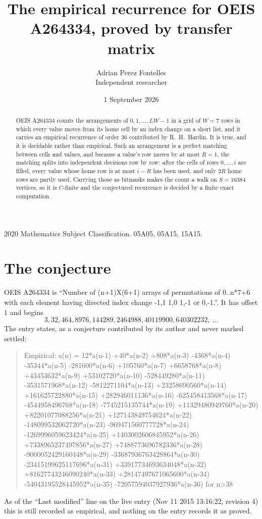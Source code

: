 \documentclass[11pt,a4paper]{article}
\title{The empirical recurrence for OEIS A264334, proved by transfer matrix}
\author{Adrian Perez Fontelles\\ \small Independent researcher}
\date{1 September 2026}
\theoremstyle{plain}
\theoremstyle{definition}
\begin{document}
\maketitle

\begin{abstract}
OEIS A264334 counts the arrangements of $0,1,\dots,LW-1$ in a grid of $W=7$ rows in which
every value moves from its home cell by an index change on a short list, and it carries an
empirical recurrence of order $36$ contributed by R.~H.~Hardin. It is true, and it is
decidable rather than empirical. Such an arrangement is a perfect matching between cells and
values, and because a value's row moves by at most $R=1$, the matching splits into
independent decisions row by row: after the cells of rows $0,\dots,i$ are filled,
every value whose home row is at most $i-R$ has been used, and only $2R$ home rows are
partly used. Carrying those as bitmasks makes the count a walk on $S=16384$ vertices, so it is
$C$-finite and the conjectured recurrence is decided by a finite exact computation.
\end{abstract}

\noindent\small 2020 Mathematics Subject Classification. 05A05, 05A15, 15A15.\normalsize

\section{The conjecture}

OEIS A264334 is ``Number of (n+1)X(6+1) arrays of permutations of 0..n*7+6 with each element having directed index change -1,1 1,0 1,-1 or 0,-1.''. It has offset $1$ and begins
\[
3, 32, 464, 8976, 144289, 2464988, 40119900, 640302232,\ \dots
\]
The entry states, as a conjecture contributed by its author and never marked settled:
\begin{quote}
Empirical: a(n) = 12*a(n-1) +40*a(n-2) +808*a(n-3) -4368*a(n-4) -35344*a(n-5) -281600*a(n-6) +105760*a(n-7) +6658768*a(n-8) +43453632*a(n-9) +53102720*a(n-10) -528449280*a(n-11) -3531571968*a(n-12) -5812271104*a(n-13) +23258690560*a(n-14) +161625722880*a(n-15) +282946011136*a(n-16) -625458413568*a(n-17) -4544958496768*a(n-18) -7745215135744*a(n-19) +11329480949760*a(n-20) +82201077088256*a(n-21) +127143849754624*a(n-22) -148099532062720*a(n-23) -969471560777728*a(n-24) -1269996059623424*a(n-25) +1403002606845952*a(n-26) +7338965237497856*a(n-27) +7488773696782336*a(n-28) -9000052429160448*a(n-29) -33687936763428864*a(n-30) -23415199625117696*a(n-31) +33917734693634048*a(n-32) +81627743246090240*a(n-33) +28147497671065600*a(n-34) -54043195528445952*a(n-35) -72057594037927936*a(n-36) for n>38
\end{quote}
As of the ``Last modified'' line on the live entry (Nov 11 2015 13:16:22, revision 4) this is still
recorded as empirical, and nothing on the entry records it as proved.
\end{document}
